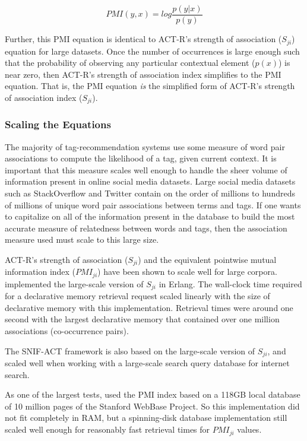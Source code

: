\documentclass[man,floatsintext,donotrepeattitle]{apa6}
\begin{document}
\begin{equation}
  \label{eqPMI}
  \mathit{PMI}(y,x) = log \frac{p(y|x)}{p(y)}
\end{equation}

Further, this PMI equation is identical to ACT-R's strength of association ($S_{ji}$) equation for large datasets.
Once the number of occurrences is large enough such that the probability of observing any particular contextual element ($p(x)$) is near zero, then ACT-R's strength of association index simplifies to the PMI equation.
That is, the PMI equation \emph{is} the simplified form of ACT-R's strength of association index ($S_{ji}$).

\subsubsection{Scaling the Equations}

The majority of tag-recommendation systems use some measure of word pair associations to compute the likelihood of a tag, given current context.
It is important that this measure scales well enough to handle the sheer volume of information present in online social media datasets.
Large social media datasets such as StackOverflow and Twitter contain on the order of millions to hundreds of millions of unique word pair associations between terms and tags.
If one wants to capitalize on all of the information present in the database to build the most accurate measure of relatedness between words and tags, then the association measure used must scale to this large size.

ACT-R's strength of association ($S_{ji}$) and the equivalent pointwise mutual information index ($\mathit{PMI}_{ji}$) have been shown to scale well for large corpora.
\textcite{Douglass2010} implemented the large-scale version of $S_{ji}$ in Erlang.
The wall-clock time required for a declarative memory retrieval request scaled linearly with the size of declarative memory with this implementation.
Retrieval times were around one second with the largest declarative memory that contained over one million associations (co-occurrence pairs).

The SNIF-ACT framework \parencites{Fu2007,Pirolli2003} is also based on the large-scale version of $S_{ji}$, and scaled well when working with a large-scale search query database for internet search.

As one of the largest tests, \textcite{Farahat2004} used the PMI index based on a 118GB local database of 10 million pages of the Stanford WebBase Project.
So this implementation did not fit completely in RAM, but a spinning-disk database implementation still scaled well enough for reasonably fast retrieval times for $\mathit{PMI}_{ji}$ values.
\end{document}
